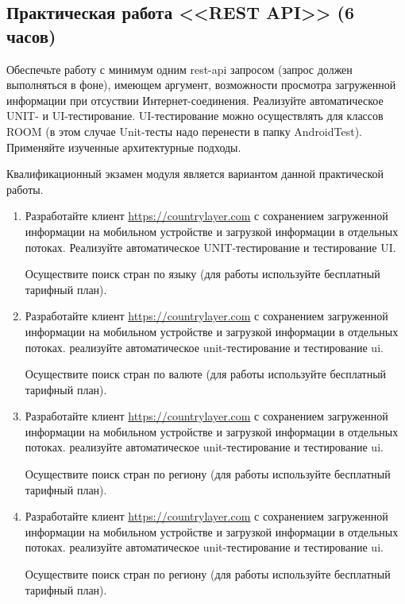\subsection{Практическая работа <<REST API>> (6 часов)}

Обеспечьте работу с минимум одним rest-api запросом (запрос должен выполняться в фоне), имеющем аргумент, 
возможности просмотра загруженной информации при отсуствии Интернет-соединения. Реализуйте автоматическое UNIT- и UI-тестирование. UI-тестирование
можно осуществлять для классов ROOM (в этом случае Unit-тесты надо перенести в папку AndroidTest). Применяйте изученные архитектурные подходы.

Квалификационный экзамен модуля является вариантом данной практической работы.

\begin{enumerate}
	\item Разработайте клиент \url{https://countrylayer.com} с сохранением загруженной информации на мобильном устройстве и загрузкой
		информации в отдельных потоках. Реализуйте автоматическое UNIT-тестирование и тестирование UI.

		Осуществите поиск стран по языку (для работы используйте бесплатный тарифный план).

	\item Разработайте клиент \url{https://countrylayer.com} с сохранением загруженной информации на мобильном устройстве и загрузкой
		информации в отдельных потоках. реализуйте автоматическое unit-тестирование и тестирование ui.

		Осуществите поиск стран по валюте (для работы используйте бесплатный тарифный план).

	\item Разработайте клиент \url{https://countrylayer.com} с сохранением загруженной информации на мобильном устройстве и загрузкой
		информации в отдельных потоках. реализуйте автоматическое unit-тестирование и тестирование ui.

		Осуществите поиск стран по региону (для работы используйте бесплатный тарифный план).

	\item Разработайте клиент \url{https://countrylayer.com} с сохранением загруженной информации на мобильном устройстве и загрузкой
		информации в отдельных потоках. реализуйте автоматическое unit-тестирование и тестирование ui.

		Осуществите поиск стран по региону (для работы используйте бесплатный тарифный план).


\end{enumerate}
